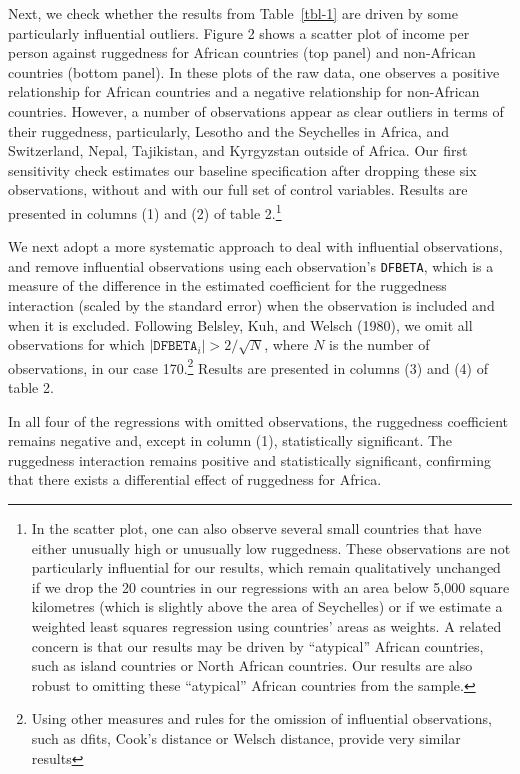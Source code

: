 \documentclass[
  letterpaper,
  DIV=11,
  numbers=noendperiod]{scrartcl}
\begin{document}
Next, we check whether the results from Table~\ref{tbl-1} are driven by
some particularly influential outliers. Figure 2 shows a scatter plot of
income per person against ruggedness for African countries (top panel)
and non-African countries (bottom panel). In these plots of the raw
data, one observes a positive relationship for African countries and a
negative relationship for non-African countries. However, a number of
observations appear as clear outliers in terms of their ruggedness,
particularly, Lesotho and the Seychelles in Africa, and Switzerland,
Nepal, Tajikistan, and Kyrgyzstan outside of Africa. Our first
sensitivity check estimates our baseline specification after dropping
these six observations, without and with our full set of control
variables. Results are presented in columns (1) and (2) of table
2.\footnote{In the scatter plot, one can also observe several small
  countries that have either unusually high or unusually low ruggedness.
  These observations are not particularly influential for our results,
  which remain qualitatively unchanged if we drop the 20 countries in
  our regressions with an area below 5,000 square kilometres (which is
  slightly above the area of Seychelles) or if we estimate a weighted
  least squares regression using countries' areas as weights. A related
  concern is that our results may be driven by ``atypical'' African
  countries, such as island countries or North African countries. Our
  results are also robust to omitting these ``atypical'' African
  countries from the sample.}

We next adopt a more systematic approach to deal with influential
observations, and remove influential observations using each
observation's \texttt{DFBETA}, which is a measure of the difference in
the estimated coefficient for the ruggedness interaction (scaled by the
standard error) when the observation is included and when it is
excluded. Following Belsley, Kuh, and Welsch (1980), we omit all
observations for which \(|\texttt{DFBETA}_i| > 2 / \sqrt{N}\), where
\(N\) is the number of observations, in our case 170.\footnote{Using
  other measures and rules for the omission of influential observations,
  such as dfits, Cook's distance or Welsch distance, provide very
  similar results} Results are presented in columns (3) and (4) of table
2.

In all four of the regressions with omitted observations, the ruggedness
coefficient remains negative and, except in column (1), statistically
significant. The ruggedness interaction remains positive and
statistically significant, confirming that there exists a differential
effect of ruggedness for Africa.
\end{document}
